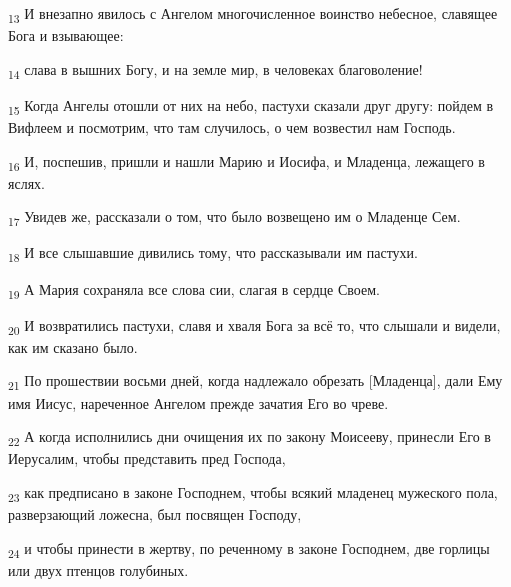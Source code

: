 \begin{tcolorbox}
\textsubscript{13} И внезапно явилось с Ангелом многочисленное воинство небесное, славящее Бога и взывающее:
\end{tcolorbox}
\begin{tcolorbox}
\textsubscript{14} слава в вышних Богу, и на земле мир, в человеках благоволение!
\end{tcolorbox}
\begin{tcolorbox}
\textsubscript{15} Когда Ангелы отошли от них на небо, пастухи сказали друг другу: пойдем в Вифлеем и посмотрим, что там случилось, о чем возвестил нам Господь.
\end{tcolorbox}
\begin{tcolorbox}
\textsubscript{16} И, поспешив, пришли и нашли Марию и Иосифа, и Младенца, лежащего в яслях.
\end{tcolorbox}
\begin{tcolorbox}
\textsubscript{17} Увидев же, рассказали о том, что было возвещено им о Младенце Сем.
\end{tcolorbox}
\begin{tcolorbox}
\textsubscript{18} И все слышавшие дивились тому, что рассказывали им пастухи.
\end{tcolorbox}
\begin{tcolorbox}
\textsubscript{19} А Мария сохраняла все слова сии, слагая в сердце Своем.
\end{tcolorbox}
\begin{tcolorbox}
\textsubscript{20} И возвратились пастухи, славя и хваля Бога за всё то, что слышали и видели, как им сказано было.
\end{tcolorbox}
\begin{tcolorbox}
\textsubscript{21} По прошествии восьми дней, когда надлежало обрезать [Младенца], дали Ему имя Иисус, нареченное Ангелом прежде зачатия Его во чреве.
\end{tcolorbox}
\begin{tcolorbox}
\textsubscript{22} А когда исполнились дни очищения их по закону Моисееву, принесли Его в Иерусалим, чтобы представить пред Господа,
\end{tcolorbox}
\begin{tcolorbox}
\textsubscript{23} как предписано в законе Господнем, чтобы всякий младенец мужеского пола, разверзающий ложесна, был посвящен Господу,
\end{tcolorbox}
\begin{tcolorbox}
\textsubscript{24} и чтобы принести в жертву, по реченному в законе Господнем, две горлицы или двух птенцов голубиных.
\end{tcolorbox}
